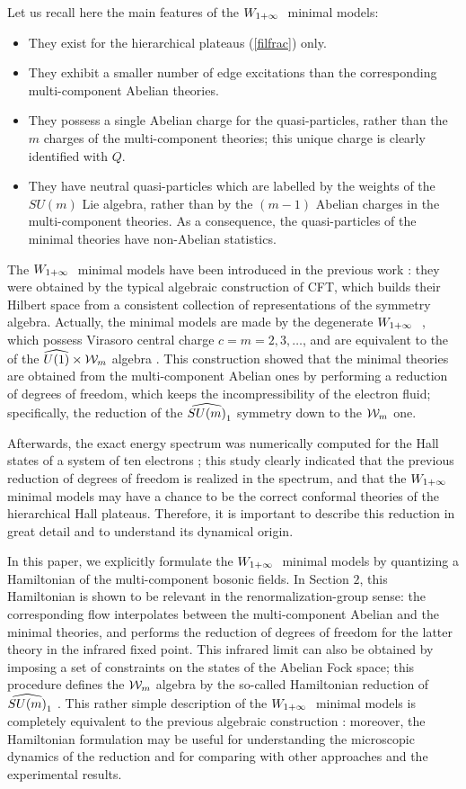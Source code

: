 Let us recall here the main features of the $W_{1+\infty}\ $ minimal models:
\begin{itemize}
\item 
They exist for the hierarchical plateaus (\ref{filfrac}) only.
\item
They exhibit a smaller number of edge excitations than the
corresponding multi-component Abelian theories.
\item 
They possess a single Abelian charge for the quasi-particles, 
rather than the $m$ charges of the multi-component theories; 
this unique charge is clearly identified with $Q$.
\item
They have neutral quasi-particles which are labelled by the
weights of the $SU(m)$ Lie algebra,
rather than by the $(m-1)$ Abelian charges in the multi-component theories.
As a consequence, the quasi-particles of the minimal theories have
non-Abelian statistics.
\end{itemize}

The $W_{1+\infty}\ $ minimal models have been introduced in the previous work 
\cite{ctz5}:
they were obtained by the typical algebraic construction of CFT, which
builds their Hilbert space from a consistent collection of 
representations of the symmetry algebra.
Actually, the minimal models are made by the degenerate $W_{1+\infty}\ $ \reps 
\cite{kac}, which possess Virasoro central charge $c=m=2,3,\dots$, and are
equivalent to the \reps of the $\u1\times {\cal W}_m$ algebra \cite{fz}.
This construction showed that the minimal theories are obtained from 
the multi-component Abelian ones by performing a reduction of
degrees of freedom, which keeps the incompressibility of the electron fluid;
specifically, the reduction of the $\widehat{SU(m)}_1$ symmetry down to the
${\cal W}_m$ one.

Afterwards, the exact energy spectrum was numerically computed 
for the Hall states of a system of ten electrons \cite{cmsz}; 
this study clearly indicated that the previous reduction of
degrees of freedom is realized in the spectrum, and
that the $W_{1+\infty}\ $ minimal models may have a chance to be the correct 
conformal theories of the hierarchical Hall plateaus.
Therefore, it is important to describe this reduction in great detail and
to understand its dynamical origin.

In this paper, we explicitly formulate the $W_{1+\infty}\ $ minimal models by
quantizing a Hamiltonian of the multi-component bosonic fields.
In Section $2$, this Hamiltonian is shown to be relevant in the 
renormalization-group sense: the corresponding flow
interpolates between the multi-component Abelian and the minimal theories,
and performs the reduction of degrees of freedom for
the latter theory in the infrared fixed point.
This infrared limit can also be obtained by imposing a set of 
constraints on the states of the Abelian Fock space; this 
procedure defines the ${\cal W}_m$ algebra by the so-called
Hamiltonian reduction of $\widehat{SU(m)}_1$ \cite{hamred}.
This rather simple description of the $W_{1+\infty}\ $ minimal models is completely
equivalent to the previous algebraic construction \cite{ctz5}:
moreover, the Hamiltonian formulation may be useful for understanding 
the microscopic dynamics of the reduction and for comparing with other 
approaches and the experimental results.

